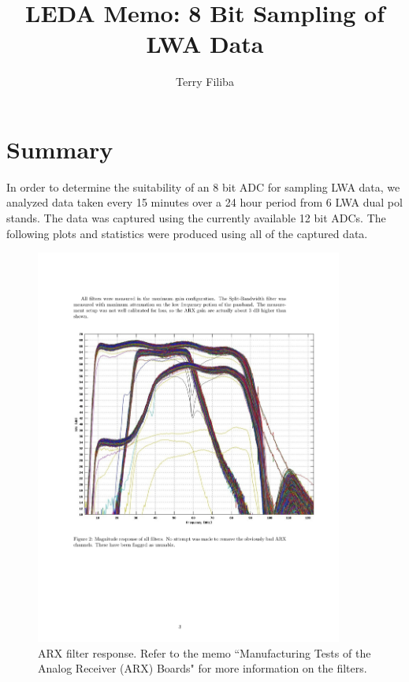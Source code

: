 \documentclass[fleqn, onecolumn]{article}
\begin{document}
\title{LEDA Memo: 8 Bit Sampling of LWA Data}
\author{Terry Filiba}
\maketitle

\section{Summary}
In order to determine the suitability of an 8 bit ADC for sampling LWA data, we analyzed data taken every 15 minutes over a 24 hour period from 6 LWA dual pol stands. 
The data was captured using the currently available 12 bit ADCs. 
The following plots and statistics were produced using all of the captured data.
\\

\begin{figure}[h] 
\includegraphics[width=0.9\textwidth]{filter_response.pdf}
\caption{ARX filter response. Refer to the memo ``Manufacturing Tests of the Analog Receiver (ARX) Boards" for more information on the filters.} 
\label{filterresponse}
\end{figure} 
\end{document}
